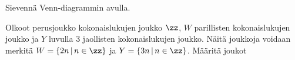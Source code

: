 \begin{tehtavasivu}
\begin{tehtava}
%    
    
\end{tehtava}

\begin{tehtava}
     Sievennä Venn-diagrammin avulla.
    \begin{alakohdat}
    \end{alakohdat}

    \begin{vastaus}
    
        \begin{alakohdat}
        \end{alakohdat}
    \end{vastaus}
    
\end{tehtava}

\begin{tehtava}
  Olkoot perusjoukko kokonaislukujen joukko $\zz$, $W$ parillisten kokonaislukujen joukko ja $Y$ luvulla $3$ jaollisten kokonaislukujen joukko. Näitä joukkoja voidaan merkitä $W = \{2n\,|\, n\in\zz\}$ ja $Y = \{3n \,|\, n \in \zz\}$. Määritä joukot   
    \begin{alakohdat}
    \end{alakohdat}

    \begin{vastaus}
    
        \begin{alakohdat}
        \end{alakohdat}
    \end{vastaus}
    
\end{tehtava}


\end{tehtavasivu}
